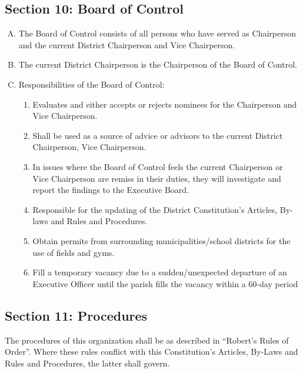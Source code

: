 \documentclass[letteraper,10pt,oneside,draft]{memoir}
\begin{document}
\subsection{Section 10: Board of Control}
\begin{enumerate}[A.]
    \item The Board of Control consists of all persons who have served as Chairperson and the current District 
    Chairperson and Vice Chairperson.
    \item The current District Chairperson is the Chairperson of the Board of Control.
    \item Responsibilities of the Board of Control:
    \begin{enumerate}[1.]
        \item Evaluates and either accepts or rejects nominees for the Chairperson and Vice Chairperson.
        \item Shall be used as a source of advice or advisors to the current District Chairperson, Vice Chairperson. 
        \item In issues where the Board of Control feels the current Chairperson or Vice Chairperson are remiss in their duties, they will investigate and report the findings to the Executive Board.
        \item Responsible for the updating of the District Constitution’s Articles, By-laws and Rules and Procedures.
        \item Obtain permits from surrounding municipalities/school districts for the use of fields and gyms.
        \item Fill a temporary vacancy due to a sudden/unexpected departure of an Executive Officer until the parish fills the vacancy within a 60-day period
    \end{enumerate}
\end{enumerate}

\subsection{Section 11: Procedures}
The procedures of this organization shall be as described in ``Robert's Rules of Order''.  Where these rules conflict with this Constitution’s Articles, By-Laws and Rules and Procedures, the latter shall govern.
    
\end{document}
